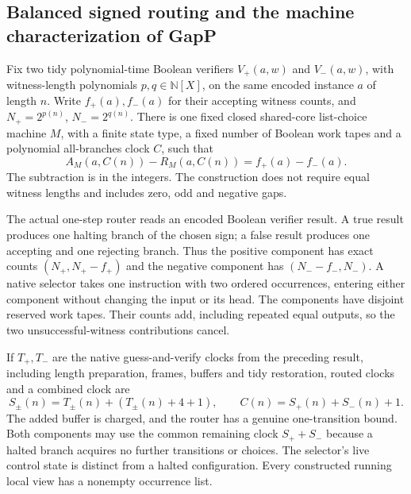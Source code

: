 \begin{result}
\subsection{Balanced signed routing and the machine characterization of GapP}
Fix two tidy polynomial-time Boolean verifiers $V_+(a,w)$ and $V_-(a,w)$,
with witness-length polynomials $p,q\in\mathbb N[X]$, on the same encoded
instance $a$ of length $n$. Write $f_+(a),f_-(a)$ for their accepting witness
counts, and $N_+=2^{p(n)}$, $N_-=2^{q(n)}$.
There is one fixed closed shared-core list-choice machine $M$, with a finite
state type, a fixed number of Boolean work tapes and a polynomial all-branches
clock $C$, such that
\[
 A_M(a,C(n))-R_M(a,C(n))=f_+(a)-f_-(a).
\]
The subtraction is in the integers. The construction does not require equal
witness lengths and includes zero, odd and negative gaps.

The actual one-step router reads an encoded Boolean verifier result. A true
result produces one halting branch of the chosen sign; a false result produces
one accepting and one rejecting branch. Thus the positive component has exact
counts $(N_+,N_+-f_+)$ and the negative component has
$(N_--f_-,N_-)$. A native selector takes one instruction with two ordered
occurrences, entering either component without changing the input or its head.
The components have disjoint reserved work tapes. Their counts add, including
repeated equal outputs, so the two unsuccessful-witness contributions cancel.

If $T_+,T_-$ are the native guess-and-verify clocks from the preceding result,
including length preparation, frames, buffers and tidy restoration, routed
clocks and a combined clock are
\[
 S_\pm(n)=T_\pm(n)+(T_\pm(n)+4+1),\qquad
 C(n)=S_+(n)+S_-(n)+1.
\]
The added buffer is charged, and the router has a genuine one-transition bound.
Both components may use the common remaining clock $S_++S_-$ because a halted
branch acquires no further transitions or choices. The selector's live control
state is distinct from a halted configuration. Every constructed running local
view has a nonempty occurrence list.


\end{result}
